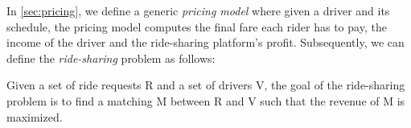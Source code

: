 \begin{definition} 
In \cref{sec:pricing}, we define a generic \textit{pricing model} where given a driver and its schedule, the pricing model computes the final fare each rider has to pay, the income of the driver and the ride-sharing platform's profit. Subsequently, we can define the \textit{ride-sharing} problem as follows:

\begin{definition} 
Given a set of ride requests R and a set of drivers V, the goal of the ride-sharing problem is to find a matching M between R and V such that the revenue of M is maximized.
\end{definition}







\end{definition}
